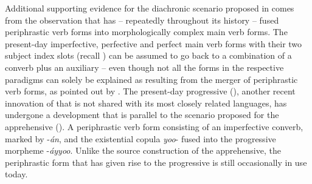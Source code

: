 \documentclass[output=paper,colorlinks,citecolor=brown,]{langscibook}
\begin{document}
Additional supporting evidence for the diachronic scenario proposed in  comes from the observation that  has -- repeatedly throughout its history -- fused periphrastic verb forms into morphologically complex main verb forms. The present-day imperfective, perfective and perfect main verb forms with their two subject index slots (recall ) can be assumed to go back to a combination of a converb plus an auxiliary -- even though not all the forms in the respective paradigms can solely be explained as resulting from the merger of periphrastic verb forms, as pointed out by \citet{Tosco1996}. The present-day progressive (), another recent innovation of  that is not shared with its most closely related languages, has undergone a development that is parallel to the scenario proposed for the apprehensive (). A periphrastic verb form consisting of an imperfective converb, marked by \nobreakdash-\textit{án}, and the existential copula \textit{yoo}- fused into the progressive morpheme \nobreakdash-\textit{áyyoo}. Unlike the source construction of the apprehensive, the periphrastic form that has given rise to the progressive is still occasionally in use today.

\end{document}

